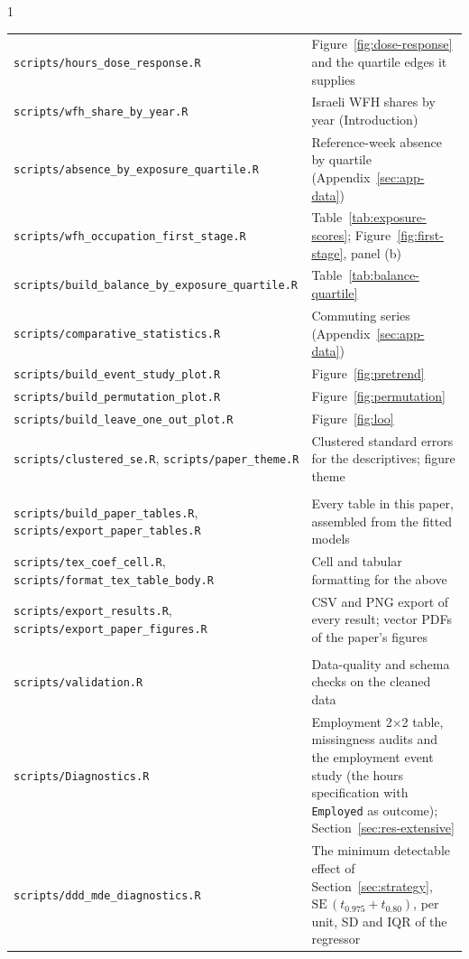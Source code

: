 \begin{spacing}{1}
\begin{center}
\begin{minipage}{\textwidth}
\begin{tabular}{@{}>{\raggedright\arraybackslash}p{}>{\raggedright\arraybackslash}p{}@{}}
\texttt{scripts/hours\_dose\_response.R} & Figure~\ref{fig:dose-response} and the quartile edges it supplies \\
\texttt{scripts/wfh\_share\_by\_year.R} & Israeli WFH shares by year (Introduction) \\
\texttt{scripts/absence\_by\_exposure\_quartile.R} & Reference-week absence by quartile (Appendix~\ref{sec:app-data}) \\
\texttt{scripts/wfh\_occupation\_first\_stage.R} & Table~\ref{tab:exposure-scores}; Figure~\ref{fig:first-stage}, panel (b) \\
\texttt{scripts/build\_balance\_by\_exposure\_quartile.R} & Table~\ref{tab:balance-quartile} \\
\texttt{scripts/comparative\_statistics.R} & Commuting series (Appendix~\ref{sec:app-data}) \\
\texttt{scripts/build\_event\_study\_plot.R} & Figure~\ref{fig:pretrend} \\
\texttt{scripts/build\_permutation\_plot.R} & Figure~\ref{fig:permutation} \\
\texttt{scripts/build\_leave\_one\_out\_plot.R} & Figure~\ref{fig:loo} \\
\texttt{scripts/clustered\_se.R}, \texttt{scripts/paper\_theme.R} & Clustered standard errors for the descriptives; figure theme \\
\multicolumn{2}{@{}l}{\emph{Generated tables and export}} \\
\texttt{scripts/build\_paper\_tables.R}, \texttt{scripts/export\_paper\_tables.R} & Every table in this paper, assembled from the fitted models \\
\texttt{scripts/tex\_coef\_cell.R}, \texttt{scripts/format\_tex\_table\_body.R} & Cell and tabular formatting for the above \\
\texttt{scripts/export\_results.R}, \texttt{scripts/export\_paper\_figures.R} & CSV and PNG export of every result; vector PDFs of the paper's figures \\
\multicolumn{2}{@{}l}{\emph{Guards and secondary diagnostics}} \\
\texttt{scripts/validation.R} & Data-quality and schema checks on the cleaned data \\
\texttt{scripts/Diagnostics.R} & Employment 2$\times$2 table, missingness audits and the employment event study (the hours specification with \texttt{Employed} as outcome); Section~\ref{sec:res-extensive} \\
\texttt{scripts/ddd\_mde\_diagnostics.R} & The minimum detectable effect of Section~\ref{sec:strategy}, $\mathrm{SE}\,(t_{0.975} + t_{0.80})$, per unit, SD and IQR of the regressor \\

\end{tabular}
\end{minipage}
\end{center}
\end{spacing}
